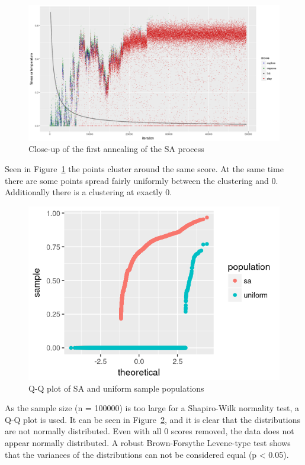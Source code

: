 \begin{figure}
    \includegraphics[width=\textwidth]{figures/sa-progress-close}
    \caption[Close-up of the first annealing of the SA process]{Close-up of the first annealing of the \gls{SA} process}
    \label{fig:sa-progress-close}
\end{figure}

Seen in Figure~\ref{fig:sa-progress-close} the points cluster around the same score.
At the same time there are some points spread fairly uniformly between the clustering and 0.
Additionally there is a clustering at exactly 0.

\begin{figure}
    \includegraphics[width=\textwidth]{figures/sa-qq}
    \caption[Q-Q plot of SA and uniform sample populations]{Q-Q plot of \gls{SA} and uniform sample populations}
    \label{fig:sa-qq}
\end{figure}

As the sample size (n = 100000) is too large for a Shapiro-Wilk normality test, a Q-Q plot is used.
It can be seen in Figure~\ref{fig:sa-qq}, and it is clear that the distributions are not normally distributed.
Even with all 0 scores removed, the data does not appear normally distributed.
A robust Brown-Forsythe Levene-type test shows that the variances of the distributions can not be considered equal (p < 0.05).

